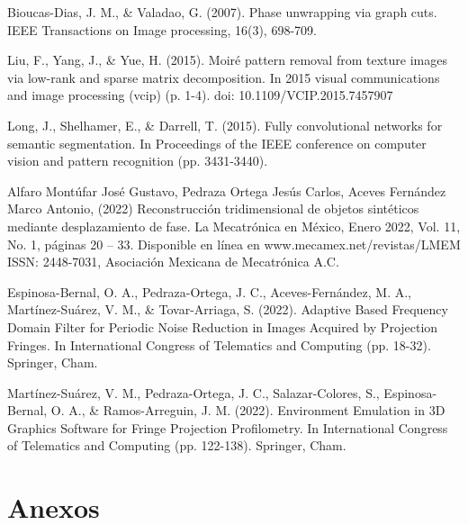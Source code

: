 \documentclass[10pt,letterpaper]{article}
\begin{document}
\begin{thebibliography}{0}
Bioucas-Dias, J. M., \& Valadao, G. (2007). Phase unwrapping via graph cuts. IEEE Transactions on Image processing, 16(3), 698-709.

Liu, F., Yang, J., \& Yue, H. (2015). Moiré pattern removal from texture images via low-rank and sparse matrix decomposition. In 2015 visual communications and image processing (vcip)
(p. 1-4). doi: 10.1109/VCIP.2015.7457907

Long, J., Shelhamer, E., \& Darrell, T. (2015). Fully convolutional networks for semantic segmentation. In Proceedings of the IEEE conference on computer vision and pattern recognition (pp. 3431-3440).

Alfaro Montúfar José Gustavo, Pedraza Ortega Jesús Carlos, Aceves Fernández
Marco Antonio, (2022) Reconstrucción tridimensional de objetos sintéticos mediante desplazamiento de fase. La Mecatrónica en México, Enero 2022, Vol. 11, No. 1, páginas 20 – 33. Disponible en línea en www.mecamex.net/revistas/LMEM
ISSN: 2448-7031, Asociación Mexicana de Mecatrónica A.C.

Espinosa-Bernal, O. A., Pedraza-Ortega, J. C., Aceves-Fernández, M. A., Martínez-Suárez, V. M., \& Tovar-Arriaga, S. (2022). Adaptive Based Frequency Domain Filter for Periodic Noise Reduction in Images Acquired by Projection Fringes. In International Congress of Telematics and Computing (pp. 18-32). Springer, Cham.

Martínez-Suárez, V. M., Pedraza-Ortega, J. C., Salazar-Colores, S., Espinosa-Bernal, O. A., \& Ramos-Arreguin, J. M. (2022). Environment Emulation in 3D Graphics Software for Fringe Projection Profilometry. In International Congress of Telematics and Computing (pp. 122-138). Springer, Cham.

\end{thebibliography}

\section{Anexos}


%
\end{document}
